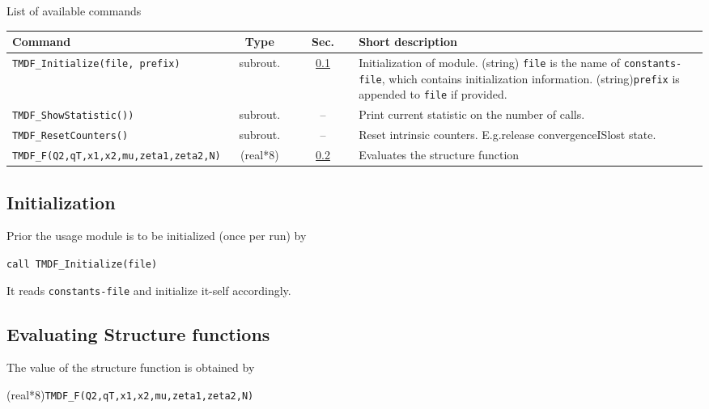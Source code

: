 \documentclass[prd,nofootinbib,eqsecnum,final]{revtex4}
\renewcommand{\(}{\left(}
\renewcommand{\)}{\right)}
\renewcommand{\[}{\left[}
\renewcommand{\]}{\right]}
\newcommand{\blue}[1]{{\color{blue} #1}}
\begin{document}
\begin{center}
List of available commands
\\
\begin{tabular}{||l|c|c|p{8cm}||}
\hline\hline
Command & ~~Type~~& ~~Sec.~~ & Short description
\\\hline
\texttt{TMDF{\_}Initialize(file,\blue{prefix})} & subrout. & \ref{TMDF:init} & Initialization of module. (string) \texttt{file} is the name of \texttt{constants-file}, which contains initialization information. (string)\texttt{prefix} is appended to \texttt{file} if provided.
\\\hline
\texttt{TMDF\_ShowStatistic())} & subrout. & -- & Print current statistic on the number of calls.
\\\hline
\texttt{TMDF\_ResetCounters()} & subrout. & -- & Reset intrinsic counters. E.g.release convergenceISlost state.
\\\hline
\texttt{TMDF{\_}F(Q2,qT,x1,x2,mu,zeta1,zeta2,N)} & (real*8) &\ref{TMDF:TMDF} & Evaluates the structure function
\\\hline\hline
\end{tabular}
\end{center}

\subsection{Initialization}
\label{TMDF:init}

Prior the usage module is to be initialized (once per run) by

\texttt{call TMDF{\_}Initialize(file)}

It reads \texttt{constants-file} and initialize it-self accordingly.

\subsection{Evaluating Structure functions}
\label{TMDF:TMDF}

The value of the structure function is obtained by

(real*8)\texttt{TMDF{\_}F(Q2,qT,x1,x2,mu,zeta1,zeta2,N)}
\end{document}
